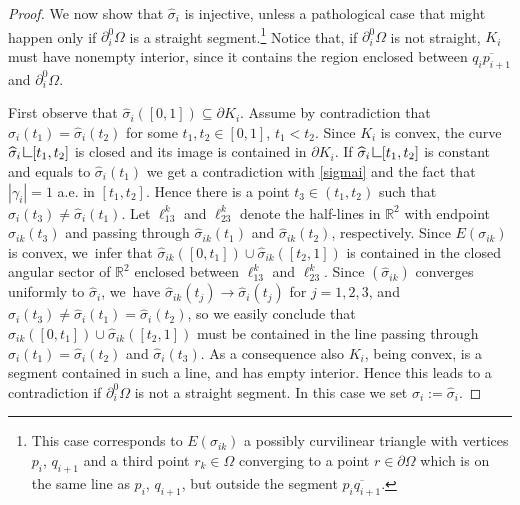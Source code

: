 \documentclass[JEP,XML,SOM,Unicode, NoFloatCountersInSection,published]{cedram}
\newcommand{\R}{\mathbb{R}}
\let\Om\Omega
\newcommand{\resa}{\mathop{\hbox{\vrule height 7pt width 0.5pt depth 0pt
\vrule height 0.5pt width 6pt depth 0pt}}\nolimits}
\newcommand{\resb}{\mathop{\hbox{\vrule height 4pt width 0.5pt depth 0pt
\vrule height 0.5pt width 3pt depth 0pt}}\nolimits}
\newcommand{\res}{\mathchoice{\resa}{\resa}{\resb}{\resb}}
\theoremstyle{definition}
\begin{document}
\begin{proof}
We now show that $\widehat\sigma_i$ is injective, unless a pathological case that might happen only if $\partial_i^0\Om$
is a straight segment.\footnote{This case corresponds to $E(\sigma_{ik})$ a possibly curvilinear triangle with vertices $p_i$, $q_{i+1}$ and a third point $r_k\in \Om$ converging to a point $r\in \partial \Om$ which is on the same line as $p_i$, $q_{i+1}$, but outside the segment $\overline{p_iq_{i+1}}$.} Notice that, if $\partial_i^0\Om$ is not straight, $K_i$ must have nonempty interior, since it contains the region enclosed between $\overline {q_ip_{i+1}}$ and $\partial_i^0\Om$.

First observe that $\widehat\sigma_i([0,1])\subseteq \partial K_i$. Assume by contradiction that $\widehat\sigma_i(t_1)=\widehat\sigma_i(t_2)$ for some $t_1,t_2\in [0,1]$, $t_1<t_2$. Since $K_i$ is convex, the curve $\widehat\sigma_i\res [t_1,t_2]$ is closed and its image is contained in $\partial K_i$. If $\widehat\sigma_i\res [t_1,t_2]$ is constant and equals to $\widehat\sigma_i(t_1)$ we get a contradiction with \eqref{sigmai} and the fact that $|\gamma_i|=1$ a.e. in $[t_1,t_2]$. Hence there is a point $t_3\in(t_1,t_2)$ such that $\widehat\sigma_i(t_3)\neq \widehat\sigma_i(t_1)$. Let $\ell^k_{13}$ and $\ell^k_{23}$
denote the half-lines in $\R^2$ with endpoint ${\widehat\sigma_{ik}(t_3)}$ and passing through $\widehat\sigma_{ik}(t_1)$ and $\widehat\sigma_{ik}(t_2)$, respectively.
Since $E(\sigma_{ik})$ is convex, we~infer that $\widehat\sigma_{ik}([0,t_1])\cup \widehat\sigma_{ik}([t_2,1])$ is contained in the closed angular sector of $\R^2$ enclosed between $\ell^k_{13}$ and $\ell^k_{23}$.
Since $(\widehat\sigma_{ik})$ converges uniformly to $\widehat\sigma_i$, we~have
$\widehat\sigma_{ik}(t_j)\to \widehat\sigma_{i}(t_j)$ for $j=1,2,3$, and $\widehat\sigma_i(t_3)\neq \widehat\sigma_i(t_1)=\widehat\sigma_i(t_2)$, so we easily conclude that $\widehat\sigma_{ik}([0,t_1])\cup \widehat\sigma_{ik}([t_2,1])$ must be contained in the line passing through $ {\widehat\sigma_{i}(t_1)=\widehat\sigma_{i}(t_2)}$ and ${\widehat\sigma_{i}(t_3)}$. As a consequence also $K_i$, being convex, is a segment contained in such a line, and has empty interior. Hence this leads to a contradiction if $\partial_i^0\Om$ is not a straight segment. In this case we set $\sigma_i:=\widehat\sigma_i$.


\end{proof}
\end{document}
